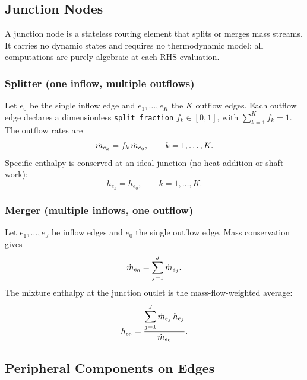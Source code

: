 \subsection{Junction Nodes}
\label{sec:network:junctions}

A junction node is a stateless routing element that splits or merges mass
streams.  It carries no dynamic states and requires no thermodynamic model;
all computations are purely algebraic at each RHS evaluation.

\subsubsection{Splitter (one inflow, multiple outflows)}

Let $e_0$ be the single inflow edge and $e_1,\dots,e_K$ the $K$ outflow edges.
Each outflow edge declares a dimensionless \texttt{split\_fraction} $f_k \in
[0,1]$, with $\sum_{k=1}^{K} f_k = 1$.  The outflow rates are
\begin{equation}
  \dot{m}_{e_k} = f_k\,\dot{m}_{e_0}, \qquad k = 1,\dots,K.
  \label{eq:junction-split}
\end{equation}
Specific enthalpy is conserved at an ideal junction (no heat addition or shaft
work):
\begin{equation}
  h_{e_k} = h_{e_0}, \qquad k = 1,\dots,K.
  \label{eq:junction-split-h}
\end{equation}

\subsubsection{Merger (multiple inflows, one outflow)}

Let $e_1,\dots,e_J$ be inflow edges and $e_0$ the single outflow edge.
Mass conservation gives
\begin{equation}
  \dot{m}_{e_0} = \sum_{j=1}^{J} \dot{m}_{e_j}.
  \label{eq:junction-merge}
\end{equation}
The mixture enthalpy at the junction outlet is the mass-flow-weighted average:
\begin{equation}
  h_{e_0} = \frac{\displaystyle\sum_{j=1}^{J} \dot{m}_{e_j}\,h_{e_j}}{\dot{m}_{e_0}}.
  \label{eq:junction-merge-h}
\end{equation}

\subsection{Peripheral Components on Edges}
\label{sec:network:peripheral}

